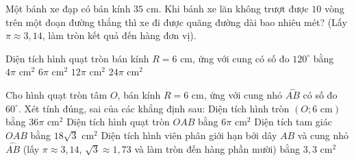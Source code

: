 \begin{bt}%
	Một bánh xe đạp có bán kính $35\text{ cm}$. Khi bánh xe lăn không trượt được $10$ vòng trên một đoạn đường thẳng thì xe đi được quãng đường dài bao nhiêu mét? (Lấy $\pi \approx 3{,}14$, làm tròn kết quả đến hàng đơn vị).
\end{bt}


\begin{ex}%
	Diện tích hình quạt tròn bán kính $R = 6\text{ cm}$, ứng với cung có số đo $120^\circ$ bằng
	\choice
	{$4\pi\text{ cm}^2$}
	{$6\pi\text{ cm}^2$}
	{\True $12\pi\text{ cm}^2$}
	{$24\pi\text{ cm}^2$}
\end{ex}

\begin{ex}%
	Cho hình quạt tròn tâm $O$, bán kính $R = 6\text{ cm}$, ứng với cung nhỏ $\overset{\frown}{AB}$ có số đo $60^\circ$. Xét tính đúng, sai của các khẳng định sau:
	\choiceTF
	{\True Diện tích hình tròn $(O; 6\text{ cm})$ bằng $36\pi\text{ cm}^2$}
	{\True Diện tích hình quạt tròn $OAB$ bằng $6\pi\text{ cm}^2$}
	{Diện tích tam giác $OAB$ bằng $18\sqrt{3}\text{ cm}^2$}
	{\True Diện tích hình viên phân giới hạn bởi dây $AB$ và cung nhỏ $\overset{\frown}{AB}$ (lấy $\pi \approx 3{,}14$, $\sqrt{3} \approx 1{,}73$ và làm tròn đến hàng phần mười) bằng $3{,}3\text{ cm}^2$}
\end{ex}

